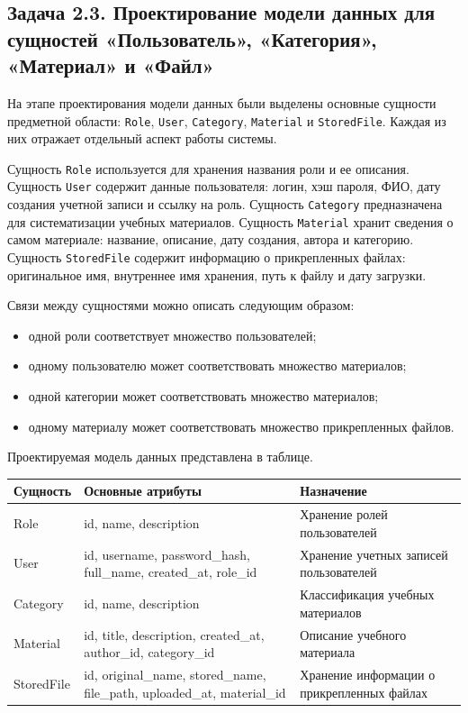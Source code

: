 \documentclass[14pt,a4paper]{extarticle}
\begin{document}
\subsection{Задача 2.3. Проектирование модели данных для сущностей «Пользователь», «Категория», «Материал» и «Файл»}

На этапе проектирования модели данных были выделены основные сущности предметной области: \texttt{Role}, \texttt{User}, \texttt{Category}, \texttt{Material} и \texttt{StoredFile}. Каждая из них отражает отдельный аспект работы системы.

Сущность \texttt{Role} используется для хранения названия роли и ее описания. Сущность \texttt{User} содержит данные пользователя: логин, хэш пароля, ФИО, дату создания учетной записи и ссылку на роль. Сущность \texttt{Category} предназначена для систематизации учебных материалов. Сущность \texttt{Material} хранит сведения о самом материале: название, описание, дату создания, автора и категорию. Сущность \texttt{StoredFile} содержит информацию о прикрепленных файлах: оригинальное имя, внутреннее имя хранения, путь к файлу и дату загрузки.

Связи между сущностями можно описать следующим образом:

\begin{itemize}[leftmargin=1.25cm]
    \item одной роли соответствует множество пользователей;
    \item одному пользователю может соответствовать множество материалов;
    \item одной категории может соответствовать множество материалов;
    \item одному материалу может соответствовать множество прикрепленных файлов.
\end{itemize}

Проектируемая модель данных представлена в таблице.

\begin{center}
\begin{tabularx}{0.96\textwidth}{>{\raggedright\arraybackslash}p{2.9cm} >{\raggedright\arraybackslash}p{4.8cm} >{\raggedright\arraybackslash}X}
\toprule
\textbf{Сущность} & \textbf{Основные атрибуты} & \textbf{Назначение} \\
\midrule
Role & id, name, description & Хранение ролей пользователей \\
User & id, username, password\_hash, full\_name, created\_at, role\_id & Хранение учетных записей пользователей \\
Category & id, name, description & Классификация учебных материалов \\
Material & id, title, description, created\_at, author\_id, category\_id & Описание учебного материала \\
StoredFile & id, original\_name, stored\_name, file\_path, uploaded\_at, material\_id & Хранение информации о прикрепленных файлах \\
\bottomrule
\end{tabularx}
\end{center}
\end{document}
